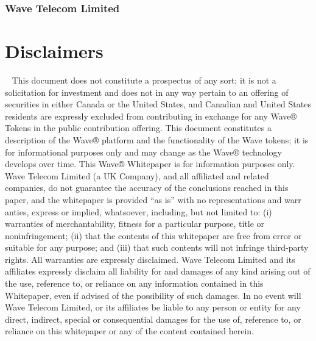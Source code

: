 \documentclass[letterpaper,10pt,openany,oneside,english]{sphinxmanual}
\begin{document}
\subsubsection{Wave Telecom Limited}
\label{\detokenize{index:make-it-wave-ltd}}

\section{Disclaimers}
\label{\detokenize{index:disclaimers}}
  This document does not constitute a prospectus of any sort; it is not a solicitation for investment and does not in any way pertain to an offering of securities in either Canada or the United States, and Canadian and United States residents are expressly excluded from contributing in exchange for any Wave® Tokens in the public contribution offering. This document constitutes a description of the Wave® platform and the functionality of the Wave tokens; it is for informational purposes only and may change as the Wave® technology develops over time. This Wave® Whitepaper is for information purposes only. Wave Telecom Limited (a UK Company), and all affiliated and related companies, do not guarantee the accuracy of the conclusions reached in this paper, and the whitepaper is provided “as is” with no representations and warr anties, express or implied, whatsoever, including, but not limited to: (i) warranties of merchantability, fitness for a particular purpose, title or noninfringement; (ii) that the contents of this whitepaper are free from error or suitable for any purpose; and (iii) that such contents will not infringe third-party rights. All warranties are expressly disclaimed. Wave Telecom Limited and its affiliates expressly disclaim all liability for and damages of any kind arising out of the use, reference to, or reliance on any information contained in this Whitepaper, even if advised of the possibility of such damages. In no event will Wave Telecom Limited, or its affiliates be liable to any person or entity for any direct, indirect, special or consequential damages for the use of, reference to, or reliance on this whitepaper or any of the content contained herein.
\end{document}
